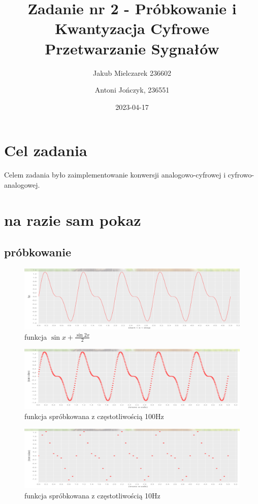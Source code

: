 \documentclass[12pt]{article}
\title{{\bf Zadanie nr 2 - Próbkowanie i Kwantyzacja}\linebreak
	Cyfrowe Przetwarzanie Sygnałów}
\author{Jakub Mielczarek 236602 \and Antoni Jończyk, 236551}
\date{2023-04-17} %
\begin{document}
\clearpage\maketitle
\thispagestyle{empty}
\newpage
\setcounter{page}{1}
\section{Cel zadania}
Celem zadania było zaimplementowanie konwersji analogowo-cyfrowej i
cyfrowo-analogowej.\cite{instrukcja2}
\section{na razie sam pokaz}
\subsection{próbkowanie}
\begin{figure}[H]
	\includegraphics[width=\linewidth]{2a.png}
	\caption{funkcja $\sin x +\frac{\sin 2x}{2}$}
\end{figure}

\begin{figure}[H]
	\includegraphics[width=\linewidth]{2a100.png}
	\caption{funkcja spróbkowana z częstotliwością 100Hz}
\end{figure}

\begin{figure}[H]
	\includegraphics[width=\linewidth]{2a10.png}
	\caption{funkcja spróbkowana z częstotliwością 10Hz}
	\label{only}
\end{figure}
\end{document}
